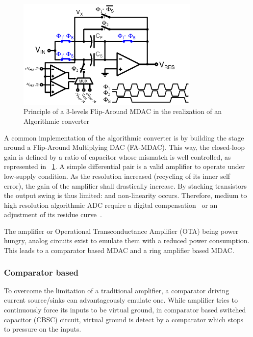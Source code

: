 \begin{figure}[htp]
	\centering
    \includegraphics[width=0.8\textwidth]{Chapter3/Figs/algo_mdac_std.ps}
	\caption{Principle of a 3-levels Flip-Around MDAC in the realization of an Algorithmic converter}
	\label{fig:algo_mdac}
\end{figure}

A common implementation of the algorithmic converter is by building the stage around a Flip-Around Multiplying DAC (FA-MDAC). This way, the closed-loop gain is defined by a ratio of capacitor whose mismatch is well controlled, as represented in \figurename~\ref{fig:algo_mdac}. A simple differential pair is a valid amplifier to operate under low-supply condition. As the resolution increased (recycling of its inner self error), the gain of the amplifier shall drastically increase. By stacking transistors the output swing is thus limited: and non-linearity occurs. Therefore, medium to high resolution algorithmic ADC require a digital compensation~\cite{Murmann2003} or an adjustment of its residue curve~\cite{Inoue2017,Naderi2017}.

The amplifier or Operational Transconductance Amplifier (OTA) being power hungry, analog circuits exist to emulate them with a reduced power consumption. This leads to a comparator based MDAC and a ring amplifier based MDAC.

	\subsubsection{Comparator based}
To overcome the limitation of a traditional amplifier, a comparator driving current source/sinks can advantageously emulate one. While amplifier tries to continuously force its inputs to be virtual ground, in comparator based switched capacitor (CBSC) circuit, virtual ground is detect by a comparator which stops to pressure on the inputs.

